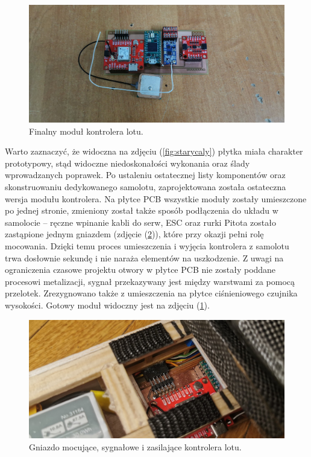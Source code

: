 \documentclass[12pt, a4paper]{article}
\let\oldref\ref
\renewcommand{\ref}[1]{(\oldref{#1})}
\begin{document}
   \begin{figure}[ht]
    \centering
    \includegraphics[width=1\textwidth]{dodokontroler}
    \caption{Finalny moduł kontrolera lotu.}
    \label{fig:dodokontroler}
\end{figure}

Warto zaznaczyć, że widoczna na zdjęciu \ref{fig:starycaly} płytka miała charakter prototypowy, stąd widoczne niedoskonałości wykonania oraz ślady wprowadzanych poprawek. Po ustaleniu ostatecznej listy komponentów oraz skonstruowaniu dedykowanego samolotu, zaprojektowana została ostateczna wersja modułu kontrolera. Na płytce PCB wszystkie moduły zostały umieszczone po jednej stronie, zmieniony został także sposób podłączenia do układu w samolocie – ręczne wpinanie kabli do serw, ESC oraz rurki Pitota zostało zastąpione jednym gniazdem (zdjęcie \ref{fig:gniazdo}), które przy okazji pełni rolę mocowania. Dzięki temu proces umieszczenia i wyjęcia kontrolera z samolotu trwa dosłownie sekundę i nie naraża elementów na uszkodzenie. Z uwagi na ograniczenia czasowe projektu otwory w płytce PCB nie zostały poddane procesowi metalizacji, sygnał przekazywany jest między warstwami za pomocą przelotek. Zrezygnowano także z umieszczenia na płytce ciśnieniowego czujnika wysokości. Gotowy moduł widoczny jest na zdjęciu \ref{fig:dodokontroler}.

   \begin{figure}[ht]
    \centering
    \includegraphics[width=1\textwidth]{gniazdo}
    \caption{Gniazdo mocujące, sygnałowe i zasilające kontrolera lotu.}
    \label{fig:gniazdo}
\end{figure}
\end{document}
